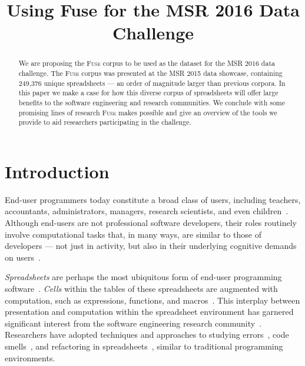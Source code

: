 \documentclass[conference]{IEEEtran}
\newcommand{\xlscount}{249,376}
\begin{document}
\title{Using Fuse for the MSR 2016 Data Challenge}

\author{
}


\maketitle

\begin{abstract}
We are proposing the \textsc{Fuse} corpus to be used as the dataset for the MSR 2016 data challenge.
The \textsc{Fuse} corpus was presented at the MSR 2015 data showcase, containing \xlscount{} unique spreadsheets --- an order of magnitude larger than previous corpora.
In this paper we make a case for how this diverse corpus of spreadsheets will offer large benefits to the software engineering and research communities.
We conclude with some promising lines of research \textsc{Fuse} makes possible and give an overview of the tools we provide to aid researchers participating in the challenge.

\end{abstract}


\IEEEpeerreviewmaketitle

\section{Introduction}

End-user programmers today constitute a broad class of users, including teachers, accountants, administrators, managers, research scientists, and even children~\cite{Ko2011}.
Although end-users are not professional software developers, their roles routinely involve computational tasks that, in many ways, are similar to those of developers --- not just in activity, but also in their underlying cognitive demands on users~\cite{Blackwell2002}. 

\emph{Spreadsheets} are perhaps the most ubiquitous form of end-user programming software~\cite{Scaffidi2005}. \emph{Cells} within the tables of these spreadsheets are augmented with computation, such as expressions, functions, and macros~\cite{Nardi1990}. 
This interplay between presentation and computation within the spreadsheet environment has garnered significant interest from the software engineering research community~\cite{Burnett2009}. 
Researchers have adopted techniques and approaches to studying errors~\cite{Powell2008}, code smells~\cite{Pinzger2012}, and refactoring in spreadsheets~\cite{Badame2012}, similar to traditional programming environments. 
\end{document}
